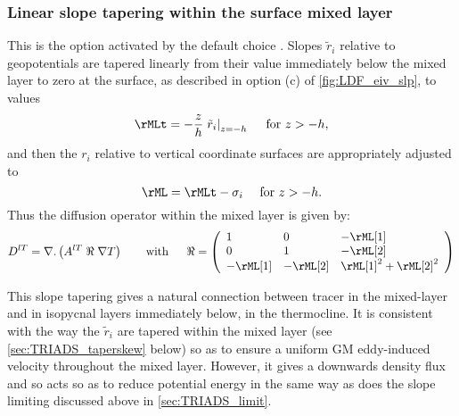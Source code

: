 \documentclass[../main/NEMO_manual]{subfiles}
\begin{document}
\subsubsection{Linear slope tapering within the surface mixed layer}
\label{sec:TRIADS_lintaper}

This is the option activated by the default choice .
Slopes $\tilde{r}_i$ relative to geopotentials are tapered linearly from their value immediately below
the mixed layer to zero at the surface, as described in option (c) of \autoref{fig:LDF_eiv_slp}, to values
\begin{equation}
  \label{eq:TRIADS_rmtilde}
  \rMLt = -\frac{z}{h}\left.\tilde{r}_i\right|_{z=-h}\quad \text{ for  } z>-h,
\end{equation}
and then the $r_i$ relative to vertical coordinate surfaces are appropriately adjusted to
\[
  \rML =\rMLt -\sigma_i \quad \text{ for  } z>-h.
\]
Thus the diffusion operator within the mixed layer is given by:
\[
  D^{lT}=\nabla {\mathrm {\mathbf .}}\left( {A^{lT}\;\Re \;\nabla T} \right) \qquad
  \mbox{with}\quad \;\;\Re =\left( {{
        \begin{array}{*{20}c}
          1 \hfill & 0 \hfill & {-\rML[1]}\hfill \\
          0 \hfill & 1 \hfill & {-\rML[2]} \hfill \\
          {-\rML[1]}\hfill &   {-\rML[2]} \hfill & {\rML[1]^2+\rML[2]^2} \hfill
        \end{array}
      }} \right)
\]

This slope tapering gives a natural connection between tracer in the mixed-layer and
in isopycnal layers immediately below, in the thermocline.
It is consistent with the way the $\tilde{r}_i$ are tapered within the mixed layer
(see \autoref{sec:TRIADS_taperskew} below) so as to ensure a uniform GM eddy-induced velocity throughout the mixed layer.
However, it gives a downwards density flux and so acts so as to reduce potential energy in the same way as
does the slope limiting discussed above in \autoref{sec:TRIADS_limit}.
\end{document}
